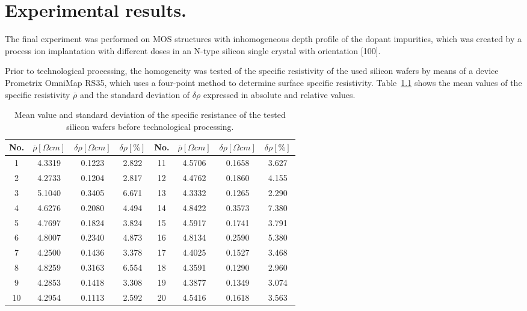 \chapter{Experimental results.}\label{Chapter7}

The final experiment was performed on MOS structures with
inhomogeneous depth profile of the dopant impurities, which was
created by a process ion implantation with different doses in an
N-type silicon single crystal with orientation [100].

Prior to technological processing, the homogeneity was tested of the
specific resistivity of the used silicon wafers by means of a device
Prometrix OmniMap RS35, which uses a four-point method to determine
surface specific resistivity. Table~\ref{tab:7.1} shows the mean
values of the specific resistivity $\overline\rho$ and the standard
deviation of $\delta\rho$ expressed in absolute and relative values.

\begin{table}[h!]\centering
  \begin{tabular}{c c c c c c c c}
    No. & $\overline\rho[\Omega cm]$ & $\delta\rho[\Omega cm]$ & $\delta\rho[\%]$ &
    No. & $\overline\rho[\Omega cm]$ & $\delta\rho[\Omega cm]$ & $\delta\rho[\%]$\\
    \hline%
    1 & 4.3319 & 0.1223 & 2.822 & 11 & 4.5706 & 0.1658 & 3.627\\
    2 & 4.2733 & 0.1204 & 2.817 & 12 & 4.4762 & 0.1860 & 4.155\\
    3 & 5.1040 & 0.3405 & 6.671 & 13 & 4.3332 & 0.1265 & 2.290\\
    4 & 4.6276 & 0.2080 & 4.494 & 14 & 4.8422 & 0.3573 & 7.380\\
    5 & 4.7697 & 0.1824 & 3.824 & 15 & 4.5917 & 0.1741 & 3.791\\
    6 & 4.8007 & 0.2340 & 4.873 & 16 & 4.8134 & 0.2590 & 5.380\\
    7 & 4.2500 & 0.1436 & 3.378 & 17 & 4.4025 & 0.1527 & 3.468\\
    8 & 4.8259 & 0.3163 & 6.554 & 18 & 4.3591 & 0.1290 & 2.960\\
    9 & 4.2853 & 0.1418 & 3.308 & 19 & 4.3877 & 0.1349 & 3.074\\
    10 & 4.2954 & 0.1113 & 2.592 & 20 & 4.5416 & 0.1618 & 3.563\\
  \end{tabular}
  \caption[Mean and standard deviation of specific resistance of the
    tested silicon wafers before technological processing]{Mean value
    and standard deviation of the specific resistance of the tested
    silicon wafers before technological processing.}\label{tab:7.1}
\end{table}

